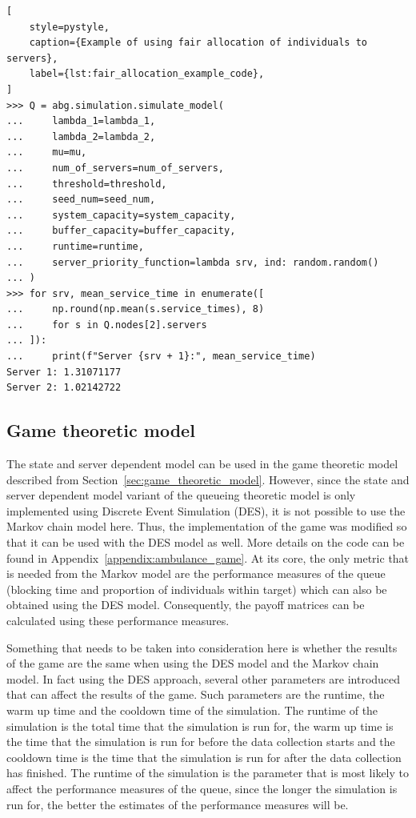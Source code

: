 \begin{lstlisting}[
    style=pystyle,
    caption={Example of using fair allocation of individuals to servers},
    label={lst:fair_allocation_example_code},
]
>>> Q = abg.simulation.simulate_model(
...     lambda_1=lambda_1,
...     lambda_2=lambda_2,
...     mu=mu,
...     num_of_servers=num_of_servers,
...     threshold=threshold,
...     seed_num=seed_num,
...     system_capacity=system_capacity,
...     buffer_capacity=buffer_capacity,
...     runtime=runtime,
...     server_priority_function=lambda srv, ind: random.random()
... )
>>> for srv, mean_service_time in enumerate([
...     np.round(np.mean(s.service_times), 8)
...     for s in Q.nodes[2].servers
... ]):
...     print(f"Server {srv + 1}:", mean_service_time)
Server 1: 1.31071177
Server 2: 1.02142722

\end{lstlisting}


\subsection{Game theoretic model}

The state and server dependent model can be used in the game theoretic
model described from Section~\ref{sec:game_theoretic_model}.
However, since the state and server dependent model variant of the queueing
theoretic model is only implemented using Discrete Event Simulation (DES), it is
not possible to use the Markov chain model here.
Thus, the implementation of the game was modified so that it can be used with
the DES model as well.
More details on the code can be found in
Appendix~\ref{appendix:ambulance_game}.
At its core, the only metric that is needed from the Markov model are the
performance measures of the queue (blocking time and proportion of individuals
within target) which can also be obtained using the DES model.
Consequently, the payoff matrices can be calculated using these performance
measures.

Something that needs to be taken into consideration here is whether the results
of the game are the same when using the DES model and the Markov chain model.
In fact using the DES approach, several other parameters are introduced that
can affect the results of the game.
Such parameters are the runtime, the warm up time and the cooldown time of the
simulation.
The runtime of the simulation is the total time that the simulation is run for,
the warm up time is the time that the simulation is run for before the
data collection starts and the cooldown time is the time that the simulation is
run for after the data collection has finished.
The runtime of the simulation is the parameter that is most likely to affect
the performance measures of the queue, since the longer the simulation is run
for, the better the estimates of the performance measures will be.

